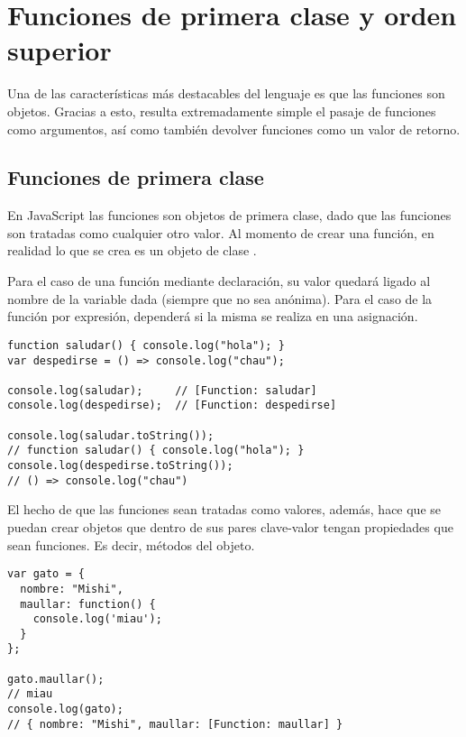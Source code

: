 \section{Funciones de primera clase y orden superior}

Una de las características más destacables del lenguaje es que las funciones son objetos. Gracias a esto, resulta extremadamente simple el pasaje de funciones como argumentos, así como también devolver funciones como un valor de retorno.

\subsection{Funciones de primera clase}

En JavaScript las funciones son objetos de primera clase, dado que las funciones son tratadas como cualquier otro valor. Al momento de crear una función, en realidad lo que se crea es un objeto de clase .

Para el caso de una función mediante declaración, su valor quedará ligado al nombre de la variable dada (siempre que no sea anónima). Para el caso de la función por expresión, dependerá si la misma se realiza en una asignación.

\begin{lstlisting}[title={Analizando el valor de una función}]
function saludar() { console.log("hola"); }
var despedirse = () => console.log("chau");

console.log(saludar);     // [Function: saludar]
console.log(despedirse);  // [Function: despedirse]

console.log(saludar.toString());  
// function saludar() { console.log("hola"); }
console.log(despedirse.toString()); 
// () => console.log("chau")
\end{lstlisting}

El hecho de que las funciones sean tratadas como valores, además, hace que se puedan crear objetos que dentro de sus pares clave-valor tengan propiedades que sean funciones. Es decir, métodos del objeto.

\begin{lstlisting}[title={Asignando una función como valor de una propiedad a un objeto}]
var gato = {
  nombre: "Mishi",
  maullar: function() {
    console.log('miau');
  }
};

gato.maullar();   
// miau
console.log(gato);  
// { nombre: "Mishi", maullar: [Function: maullar] }
\end{lstlisting}

